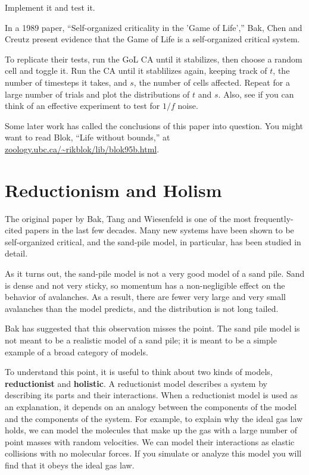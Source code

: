 \documentclass[10pt]{book}
\begin{document}
\begin{ex}

Implement it and test it.

\end{ex}



\begin{ex}

In a 1989 paper, ``Self-organized criticality in the 'Game of Life',''
Bak, Chen and Creutz present evidence that the Game of Life
is a self-organized critical system.

To replicate their tests, run the GoL CA until it stabilizes,
then choose a random cell and toggle it.  Run the CA until
it stablilizes again, keeping track of $t$, the number
of timesteps it takes, and $s$, the number of cells affected.
Repeat for a large number of trials and plot the distributions
of $t$ and $s$.  Also, see if you can think of an effective
experiment to test for $1/f$ noise.

Some later work has called the conclusions of this paper into
question.  You might want to read Blok, ``Life without bounds,''
at \url{zoology.ubc.ca/~rikblok/lib/blok95b.html}.

\end{ex}


\section{Reductionism and Holism}

The original paper by Bak, Tang and Wiesenfeld is one of
the most frequently-cited papers in the last few decades.
Many new systems have been shown to be self-organized critical,
and the sand-pile model, in particular, has been studied
in detail.

As it turns out, the sand-pile model is not a very good model
of a sand pile.  Sand is dense and not very sticky, so momentum
has a non-negligible effect on the behavior of avalanches.  As
a result, there are fewer very large and very small avalanches
than the model predicts, and the distribution is not long tailed.

Bak has suggested that this observation misses the point.
The sand pile model is not meant to be a realistic model of a sand
pile; it is meant to be a simple example of a broad category of
models.

To understand this point, it is useful to think about two
kinds of models, {\bf reductionist} and {\bf holistic}.  A
reductionist model describes a system by describing its parts
and their interactions.  When a reductionist model is used
as an explanation, it depends on an analogy between the 
components of the model and the components of the system.
For example, to explain why the ideal gas law holds, we can
model the molecules that make up the gas with a large number
of point masses with random velocities.  We can model their
interactions as elastic collisions with no molecular forces.
If you simulate or analyze this model you will find that it
obeys the ideal gas law.
\end{document}
